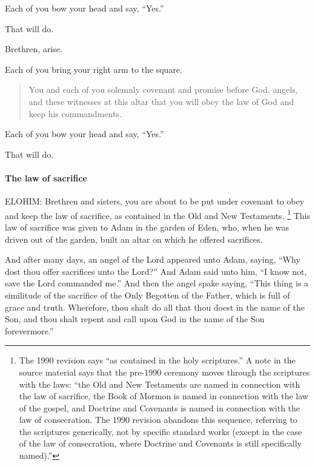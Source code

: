 				Each of you bow your head and say, ``Yes.''

				That will do.

				Brethren, arise.

				Each of you bring your right arm to the square.

				\begin{quote}
					You and each of you solemnly covenant and promise before God, angels, and these witnesses at this altar that you will obey the law of God and keep his commandments.
				\end{quote}
				
				Each of you bow your head and say, ``Yes.''

				That will do.
				
			\paragraph{The law of sacrifice}
				\label{TEMPLE-ENDOWMENT-ENDOW-PRE-1990-SACRIFICE}
			
				ELOHIM: Brethren and sisters, you are about to be put under covenant to obey and keep the law of sacrifice, as contained in the Old and New Testaments.%
					\footnote{%
						\label{ENDOWMENT-testaments}%
						The 1990 revision says ``as contained in the holy scriptures.'' A note in the source material says that the pre-1990 ceremony moves through the scriptures with the laws: ``the Old and New Testaments are named in connection with the law of sacrifice, the Book of Mormon is named in connection with the law of the gospel, and Doctrine and Covenants is named in connection with the law of consecration. The 1990 revision abandons this sequence, referring to the scriptures generically, not by specific standard works (except in the case of the law of consecration, where Doctrine and Covenants is still specifically named).''
						}
				This law of sacrifice was given to Adam in the garden of Eden, who, when he was driven out of the garden, built an altar on which he offered sacrifices.

				And after many days, an angel of the Lord appeared unto Adam, saying, ``Why dost thou offer sacrifices unto the Lord?'' And Adam said unto him, ``I know not, save the Lord commanded me.'' And then the angel spake saying, ``This thing is a similitude of the sacrifice of the Only Begotten of the Father, which is full of grace and truth. Wherefore, thou shalt do all that thou doest in the name of the Son, and thou shalt repent and call upon God in the name of the Son forevermore.''

